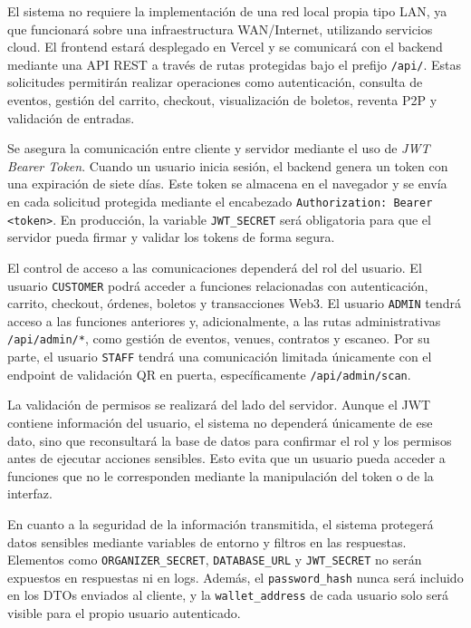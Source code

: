 \documentclass[12pt,letterpaper]{article}
\begin{document}
El sistema no requiere la implementación de una red local propia tipo LAN, ya
que funcionará sobre una infraestructura WAN/Internet, utilizando servicios
cloud. El frontend estará desplegado en Vercel y se comunicará con el backend
mediante una API REST a través de rutas protegidas bajo el prefijo
\texttt{/api/}. Estas solicitudes permitirán realizar operaciones como
autenticación, consulta de eventos, gestión del carrito, checkout,
visualización de boletos, reventa P2P y validación de entradas.

Se asegura la comunicación entre cliente y servidor mediante el uso de
\textit{JWT Bearer Token}. Cuando un usuario inicia sesión, el backend genera
un token con una expiración de siete días. Este token se almacena en el
navegador y se envía en cada solicitud protegida mediante el encabezado
\texttt{Authorization: Bearer <token>}. En producción, la variable
\texttt{JWT\_SECRET} será obligatoria para que el servidor pueda firmar y
validar los tokens de forma segura.

El control de acceso a las comunicaciones dependerá del rol del usuario. El
usuario \texttt{CUSTOMER} podrá acceder a funciones relacionadas con
autenticación, carrito, checkout, órdenes, boletos y transacciones Web3. El
usuario \texttt{ADMIN} tendrá acceso a las funciones anteriores y,
adicionalmente, a las rutas administrativas \texttt{/api/admin/*}, como gestión
de eventos, venues, contratos y escaneo. Por su parte, el usuario
\texttt{STAFF} tendrá una comunicación limitada únicamente con el endpoint de
validación QR en puerta, específicamente \texttt{/api/admin/scan}.

La validación de permisos se realizará del lado del servidor. Aunque el JWT
contiene información del usuario, el sistema no dependerá únicamente de ese
dato, sino que reconsultará la base de datos para confirmar el rol y los
permisos antes de ejecutar acciones sensibles. Esto evita que un usuario pueda
acceder a funciones que no le corresponden mediante la manipulación del token o
de la interfaz.

En cuanto a la seguridad de la información transmitida, el sistema protegerá
datos sensibles mediante variables de entorno y filtros en las respuestas.
Elementos como \texttt{ORGANIZER\_SECRET}, \texttt{DATABASE\_URL} y
\texttt{JWT\_SECRET} no serán expuestos en respuestas ni en logs. Además, el
\texttt{password\_hash} nunca será incluido en los DTOs enviados al cliente, y
la \texttt{wallet\_address} de cada usuario solo será visible para el propio
usuario autenticado.
\end{document}

